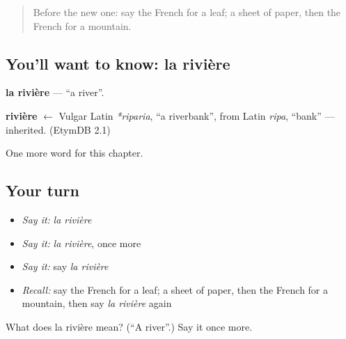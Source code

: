 \begin{quote}
Before the new one: say the French for a leaf; a sheet of paper, then the French for a mountain.
\end{quote}

\subsection*{You'll want to know: la rivière}
\textbf{la rivière} — \textquotedblleft{}a river\textquotedblright{}.

\begin{cousinweb}
\textbf{rivière} $\leftarrow$ Vulgar Latin \emph{*riparia}, \textquotedblleft{}a riverbank\textquotedblright{}, from Latin \emph{ripa}, \textquotedblleft{}bank\textquotedblright{} — inherited. (EtymDB 2.1)
\end{cousinweb}

\begin{grammarlens}[title={What you've built}]
One more word for this chapter.
\end{grammarlens}

\subsection*{Your turn}
\begin{itemize}
\raggedright
  \item \emph{Say it:} \emph{la rivière}
  \item \emph{Say it:} \emph{la rivière}, once more
  \item \emph{Say it:} say \emph{la rivière}
  \item \emph{Recall:} say the French for a leaf; a sheet of paper, then the French for a mountain, then say \emph{la rivière} again
\end{itemize}

\begin{tcolorbox}[breakable,colback=teal!4,colframe=teal!35!black,title={Before you move on}]
What does la rivière mean? (\textquotedblleft{}A river\textquotedblright{}.) Say it once more.
\end{tcolorbox}
